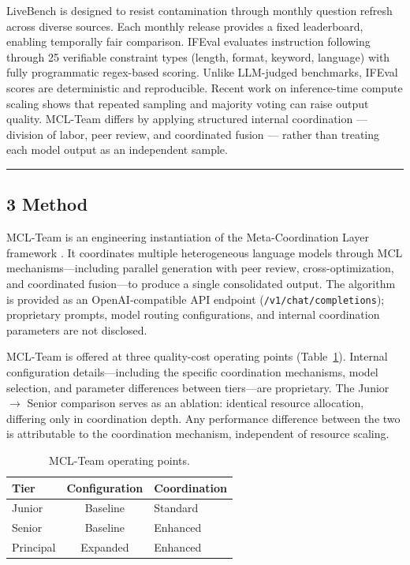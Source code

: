 \documentclass[
]{article}
\begin{document}
LiveBench \cite{White2024LiveBench} is designed to resist contamination through monthly question refresh across diverse sources. Each monthly release provides a fixed leaderboard, enabling temporally fair comparison. IFEval \cite{Zhou2024IFEval} evaluates instruction following through 25 verifiable constraint types (length, format, keyword, language) with fully programmatic regex-based scoring. Unlike LLM-judged benchmarks, IFEval scores are deterministic and reproducible. Recent work on inference-time compute scaling \cite{Brown2024LLMonkeys,Chen2024CompoundInference} shows that repeated sampling and majority voting can raise output quality. MCL-Team differs by applying structured internal coordination — division of labor, peer review, and coordinated fusion — rather than treating each model output as an independent sample.

\begin{center}\rule{0.5\linewidth}{0.5pt}\end{center}

\subsection{3 Method}\label{method}

MCL-Team is an engineering instantiation of the Meta-Coordination Layer framework \cite{Zhang2025MCL}. It coordinates multiple heterogeneous language models through MCL mechanisms---including parallel generation with peer review, cross-optimization, and coordinated fusion---to produce a single consolidated output. The algorithm is provided as an OpenAI-compatible API endpoint (\texttt{/v1/chat/completions}); proprietary prompts, model routing configurations, and internal coordination parameters are not disclosed.

MCL-Team is offered at three quality-cost operating points (Table~\ref{tab:tiers}). Internal configuration details---including the specific coordination mechanisms, model selection, and parameter differences between tiers---are proprietary. The Junior $\rightarrow$ Senior comparison serves as an ablation: identical resource allocation, differing only in coordination depth. Any performance difference between the two is attributable to the coordination mechanism, independent of resource scaling.

\begin{table}[H]
\centering
\caption{MCL-Team operating points.}
\label{tab:tiers}
\begin{tabular}{@{}lcl@{}}
\toprule
\textbf{Tier} & \textbf{Configuration} & \textbf{Coordination} \\
\midrule
Junior  & Baseline & Standard \\
Senior  & Baseline & Enhanced \\
Principal & Expanded & Enhanced \\
\bottomrule
\end{tabular}
\end{table}
\end{document}
